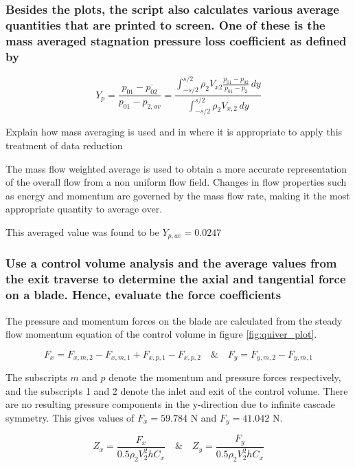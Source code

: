\documentclass{article}
\begin{document}
\subsubsection{Besides the plots, the script also calculates various average quantities that are printed
to screen. One of these is the mass averaged stagnation pressure loss coefficient as defined by}


\begin{equation}
    Y_p = \frac{p_{01} - \overline{p_{02}}}{p_{01} - p_{2,av}} = \frac{\int_{-s/2}^{s/2} \rho_2 V_{x2} \frac{p_{01} - p_{02}}{p_{01} - p_2} \, dy}{\int_{-s/2}^{s/2} \rho_2 V_{x,2} \, dy}
\end{equation}

Explain how mass averaging is used and in where it is appropriate to apply this treatment of
data reduction

The mass flow weighted average is used to obtain a more accurate representation of the overall flow from a non uniform flow field.
Changes in flow properties such as energy and momentum are governed by the mass flow rate, making it the most appropriate quantity to average over.

This averaged value was found to be $Y_{p,av} = 0.0247$

\subsubsection{Use a control volume analysis and the average values from the exit traverse to determine
the axial and tangential force on a blade. Hence, evaluate the force coefficients
}
The pressure and momentum forces on the blade are calculated from the steady flow momentum equation of the control volume in figure \ref{fig:quiver_plot}.

\begin{equation}
    F_x =  F_{x,m,2} - F_{x,m,1} + F_{x,p,1} - F_{x,p,2} \quad \& \quad F_y =  F_{y,m,2} - F_{y,m,1}
\end{equation}

The subscripts $m$ and $p$ denote the momentum and pressure forces respectively, and the subscripts 1 and 2 denote the inlet and exit of the control volume.
There are no resulting pressure components in the y-direction due to infinite cascade symmetry.
This gives values of $F_x = 59.784$ N and $F_y = 41.042$ N.

\begin{equation}
    Z_x = \frac{F_x}{0.5 \rho_2 V_2^2 h C_x} \quad \& \quad Z_y = \frac{F_y}{0.5 \rho_2 V_2^2 h C_x}
\end{equation}
\end{document}
